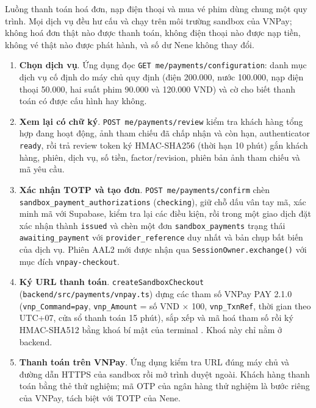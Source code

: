 Luồng thanh toán hoá đơn, nạp điện thoại và mua vé phim dùng chung một quy trình. Mọi dịch vụ đều hư cấu và chạy trên môi trường sandbox của VNPay; không hoá đơn thật nào được thanh toán, không điện thoại nào được nạp tiền, không vé thật nào được phát hành, và số dư Nene không thay đổi.
\begin{enumerate}
  \item \textbf{Chọn dịch vụ}. Ứng dụng đọc \texttt{GET me/\allowbreak{}payments/\allowbreak{}configuration}: danh mục dịch vụ cố định do máy chủ quy định (điện 200.000, nước 100.000, nạp điện thoại 50.000, hai suất phim 90.000 và 120.000 VND) và cờ cho biết thanh toán có được cấu hình hay không.
  \item \textbf{Xem lại có chữ ký}. \texttt{POST me/\allowbreak{}payments/\allowbreak{}review} kiểm tra khách hàng tổng hợp đang hoạt động, ảnh tham chiếu đã chấp nhận và còn hạn, authenticator \texttt{ready}, rồi trả review token ký HMAC-SHA256 (thời hạn 10 phút) gắn khách hàng, phiên, dịch vụ, số tiền, factor/revision, phiên bản ảnh tham chiếu và mã yêu cầu.
  \item \textbf{Xác nhận TOTP và tạo đơn}. \texttt{POST me/\allowbreak{}payments/\allowbreak{}confirm} chèn \texttt{sandbox\_\allowbreak{}payment\_\allowbreak{}authorizations} (\texttt{checking}), giữ chỗ dấu vân tay mã, xác minh mã với Supabase, kiểm tra lại các điều kiện, rồi trong một giao dịch đặt xác nhận thành \texttt{issued} và chèn một đơn \texttt{sandbox\_\allowbreak{}payments} trạng thái \texttt{awaiting\_\allowbreak{}payment} với \texttt{provider\_\allowbreak{}reference} duy nhất và bản chụp bất biến của dịch vụ. Phiên AAL2 mới được nhận qua \texttt{SessionOwner.\allowbreak{}exchange()} với mục đích \texttt{vnpay-\allowbreak{}checkout}.
  \item \textbf{Ký URL thanh toán}. \texttt{create\allowbreak{}Sandbox\allowbreak{}Checkout} (\texttt{backend/\allowbreak{}src/\allowbreak{}payments/\allowbreak{}vnpay.\allowbreak{}ts}) dựng các tham số VNPay PAY 2.1.0 (\texttt{vnp\_\allowbreak{}Command=pay}, \texttt{vnp\_\allowbreak{}Amount} = số VND $\times$ 100, \texttt{vnp\_\allowbreak{}TxnRef}, thời gian theo UTC+07, cửa sổ thanh toán 15 phút), sắp xếp và mã hoá tham số rồi ký HMAC-SHA512 bằng khoá bí mật của terminal \parencite{ch2-vnpay-pay}. Khoá này chỉ nằm ở backend.
  \item \textbf{Thanh toán trên VNPay}. Ứng dụng kiểm tra URL đúng máy chủ và đường dẫn HTTPS của sandbox rồi mở trình duyệt ngoài. Khách hàng thanh toán bằng thẻ thử nghiệm; mã OTP của ngân hàng thử nghiệm là bước riêng của VNPay, tách biệt với TOTP của Nene.

\end{enumerate}
